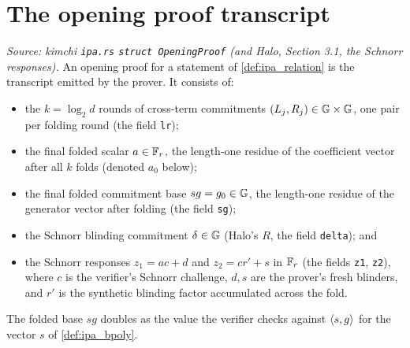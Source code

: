 \section{The opening proof transcript}

\begin{definition}
  \label{def:ipa_opening_proof}
  \textit{Source: kimchi \texttt{ipa.rs} \texttt{struct OpeningProof} (and Halo,
  Section 3.1, the Schnorr responses).}
  An opening proof for a statement of \cref{def:ipa_relation} is the transcript
  emitted by the prover. It consists of:
  \begin{itemize}
    \item the \(k = \log_{2} d\) rounds of cross-term commitments
      \((L_{j}, R_{j}) \in \mathbb{G} \times \mathbb{G}\), one pair per folding round (the
      field \texttt{lr});
    \item the final folded scalar \(a \in \mathbb{F}_r\), the length-one residue of the
      coefficient vector after all \(k\) folds (denoted \(a_{0}\) below);
    \item the final folded commitment base \(sg = g_{0} \in \mathbb{G}\), the length-one
      residue of the generator vector after folding (the field \texttt{sg});
    \item the Schnorr blinding commitment \(\delta \in \mathbb{G}\) (Halo's \(R\), the
      field \texttt{delta}); and
    \item the Schnorr responses \(z_{1} = a c + d\) and \(z_{2} = c r' + s\) in
      \(\mathbb{F}_r\) (the fields \texttt{z1}, \texttt{z2}), where \(c\) is the
      verifier's Schnorr challenge, \(d, s\) are the prover's fresh blinders, and
      \(r'\) is the synthetic blinding factor accumulated across the fold.
  \end{itemize}
  The folded base \(sg\) doubles as the value the verifier checks against
  \(\langle s, g \rangle\) for the vector \(s\) of \cref{def:ipa_bpoly}.
\end{definition}


